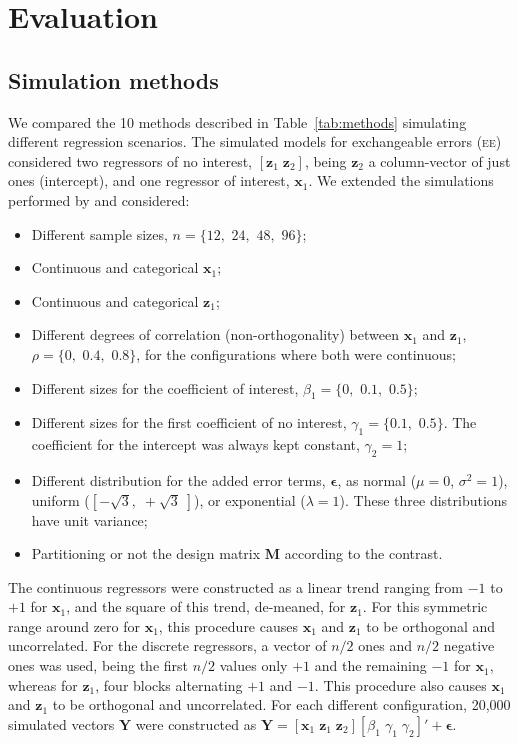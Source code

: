 \section{Evaluation}
\label{sec:comparison}

\subsection{Simulation methods}

We compared the 10 methods described in Table~\ref{tab:methods} simulating different regression scenarios. The simulated models for exchangeable errors (\textsc{ee}) considered two regressors of no interest, $[\mathbf{z}_{1} \; \mathbf{z}_{2}]$, being $\mathbf{z}_{2}$ a column-vector of just ones (intercept), and one regressor of interest, $\mathbf{x}_{1}$. We extended the simulations performed by \citet{Anderson1999} and considered:

\begin{itemize}
\item Different sample sizes, $n=\{12,$ $24,$ $48,$ $96\}$;
\item Continuous and categorical $\mathbf{x}_{1}$;
\item Continuous and categorical $\mathbf{z}_{1}$;
\item Different degrees of correlation (non-orthogonality) between $\mathbf{x}_{1}$ and $\mathbf{z}_{1}$, $\rho = \{0,$ $0.4,$ $0.8\}$, for the configurations where both were continuous;
\item Different sizes for the coefficient of interest, $\beta_{1}=\{0,$ $0.1,$ $0.5\}$;
\item Different sizes for the first coefficient of no interest, $\gamma_{1}=\{0.1,$ $0.5\}$. The coefficient for the intercept was always kept constant, $\gamma_{2}=1$;
\item Different distribution for the added error terms, $\boldsymbol{\epsilon}$, as normal ($\mu=0$, $\sigma^2=1$), uniform ($\left[-\sqrt{3},\; +\sqrt{3}\;\right]$), or exponential ($\lambda=1$). These three distributions have unit variance;
\item Partitioning or not the design matrix $\mathbf{M}$ according to the contrast.
\end{itemize}

The continuous regressors were constructed as a linear trend ranging from $-1$ to $+1$ for $\mathbf{x}_1$, and the square of this trend, de-meaned, for $\mathbf{z}_1$. For this symmetric range around zero for $\mathbf{x}_1$, this procedure causes $\mathbf{x}_1$ and $\mathbf{z}_1$ to be orthogonal and uncorrelated. For the discrete regressors, a vector of $n/2$ ones and $n/2$ negative ones was used, being the first $n/2$ values only $+1$ and the remaining $-1$ for $\mathbf{x}_1$, whereas for $\mathbf{z}_1$, four blocks alternating $+1$ and $-1$. This procedure also causes $\mathbf{x}_1$ and $\mathbf{z}_1$ to be orthogonal and uncorrelated. For each different configuration, 20,000 simulated vectors $\mathbf{Y}$ were constructed as $\mathbf{Y}=[\mathbf{x}_{1} \; \mathbf{z}_{1} \; \mathbf{z}_{2}][\beta_1 \; \gamma_1 \; \gamma_2]'+\boldsymbol{\epsilon}$.


